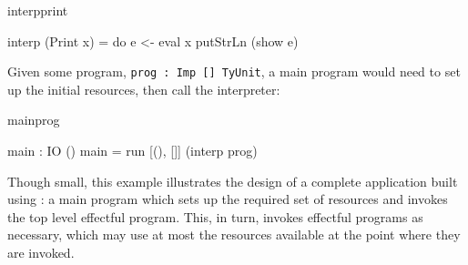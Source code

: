 \begin{SaveVerbatim}{interpprint}

interp (Print x) 
     = do e <- eval x
          putStrLn (show e)

\end{SaveVerbatim}

% 
% 
% 
% 
% 
% 
% 
% 
% 

\noindent
Given some program, \texttt{prog : Imp [] TyUnit}, a main program would need
to set up the initial resources, then call the interpreter:

\begin{SaveVerbatim}{mainprog}

main : IO ()
main = run [(), []] (interp prog)

\end{SaveVerbatim}

\noindent
Though small, this example illustrates the design of a complete application
built using \Eff{}: a main program which sets up the required set of resources
and invokes the top level effectful program. This, in turn, invokes effectful
programs as necessary, which may use at most the resources available at the
point where they are invoked.

